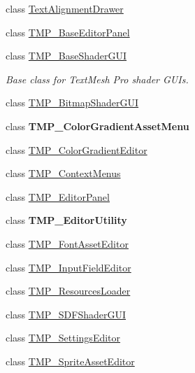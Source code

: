 \begin{DoxyCompactItemize}
\item 
class \mbox{\hyperlink{class_t_m_pro_1_1_editor_utilities_1_1_text_alignment_drawer}{Text\+Alignment\+Drawer}}
\item 
class \mbox{\hyperlink{class_t_m_pro_1_1_editor_utilities_1_1_t_m_p___base_editor_panel}{T\+M\+P\+\_\+\+Base\+Editor\+Panel}}
\item 
class \mbox{\hyperlink{class_t_m_pro_1_1_editor_utilities_1_1_t_m_p___base_shader_g_u_i}{T\+M\+P\+\_\+\+Base\+Shader\+G\+UI}}
\begin{DoxyCompactList}\small\item\em Base class for Text\+Mesh Pro shader G\+U\+Is. \end{DoxyCompactList}\item 
class \mbox{\hyperlink{class_t_m_pro_1_1_editor_utilities_1_1_t_m_p___bitmap_shader_g_u_i}{T\+M\+P\+\_\+\+Bitmap\+Shader\+G\+UI}}
\item 
class {\bfseries T\+M\+P\+\_\+\+Color\+Gradient\+Asset\+Menu}
\item 
class \mbox{\hyperlink{class_t_m_pro_1_1_editor_utilities_1_1_t_m_p___color_gradient_editor}{T\+M\+P\+\_\+\+Color\+Gradient\+Editor}}
\item 
class \mbox{\hyperlink{class_t_m_pro_1_1_editor_utilities_1_1_t_m_p___context_menus}{T\+M\+P\+\_\+\+Context\+Menus}}
\item 
class \mbox{\hyperlink{class_t_m_pro_1_1_editor_utilities_1_1_t_m_p___editor_panel}{T\+M\+P\+\_\+\+Editor\+Panel}}
\item 
class {\bfseries T\+M\+P\+\_\+\+Editor\+Utility}
\item 
class \mbox{\hyperlink{class_t_m_pro_1_1_editor_utilities_1_1_t_m_p___font_asset_editor}{T\+M\+P\+\_\+\+Font\+Asset\+Editor}}
\item 
class \mbox{\hyperlink{class_t_m_pro_1_1_editor_utilities_1_1_t_m_p___input_field_editor}{T\+M\+P\+\_\+\+Input\+Field\+Editor}}
\item 
class \mbox{\hyperlink{class_t_m_pro_1_1_editor_utilities_1_1_t_m_p___resources_loader}{T\+M\+P\+\_\+\+Resources\+Loader}}
\item 
class \mbox{\hyperlink{class_t_m_pro_1_1_editor_utilities_1_1_t_m_p___s_d_f_shader_g_u_i}{T\+M\+P\+\_\+\+S\+D\+F\+Shader\+G\+UI}}
\item 
class \mbox{\hyperlink{class_t_m_pro_1_1_editor_utilities_1_1_t_m_p___settings_editor}{T\+M\+P\+\_\+\+Settings\+Editor}}
\item 
class \mbox{\hyperlink{class_t_m_pro_1_1_editor_utilities_1_1_t_m_p___sprite_asset_editor}{T\+M\+P\+\_\+\+Sprite\+Asset\+Editor}}

\end{DoxyCompactItemize}
